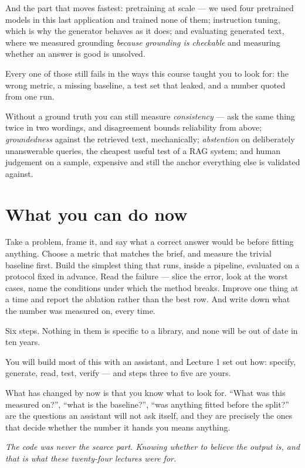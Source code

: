 \documentclass[11pt,a4paper]{article}
\begin{document}
And the part that moves fastest: pretraining at scale --- we used four
pretrained models in this last application and trained none of them;
instruction tuning, which is why the generator behaves as it does; and
evaluating generated text, where we measured grounding \emph{because grounding
is checkable} and measuring whether an answer is good is unsolved.

\begin{keybox}[title={The transferable part}]
Every one of those still fails in the ways this course taught you to look for:
the wrong metric, a missing baseline, a test set that leaked, and a number
quoted from one run.
\end{keybox}

Without a ground truth you can still measure \emph{consistency} --- ask the
same thing twice in two wordings, and disagreement bounds reliability from
above; \emph{groundedness} against the retrieved text, mechanically;
\emph{abstention} on deliberately unanswerable queries, the cheapest useful
test of a RAG system; and human judgement on a sample, expensive and still the
anchor everything else is validated against.

\section{What you can do now}

Take a problem, frame it, and say what a correct answer would be before fitting
anything. Choose a metric that matches the brief, and measure the trivial
baseline first. Build the simplest thing that runs, inside a pipeline,
evaluated on a protocol fixed in advance. Read the failure --- slice the error,
look at the worst cases, name the conditions under which the method breaks.
Improve one thing at a time and report the ablation rather than the best row.
And write down what the number was measured on, every time.

Six steps. Nothing in them is specific to a library, and none will be out of
date in ten years.

\begin{keybox}[title={A last word on the assistant}]
You will build most of this with an assistant, and Lecture 1 set out how:
specify, generate, read, test, verify --- and steps three to five are yours.

What has changed by now is that you know what to look for. ``What was this
measured on?'', ``what is the baseline?'', ``was anything fitted before the
split?'' are the questions an assistant will not ask itself, and they are
precisely the ones that decide whether the number it hands you means anything.

\emph{The code was never the scarce part. Knowing whether to believe the output
is, and that is what these twenty-four lectures were for.}
\end{keybox}
\end{document}
